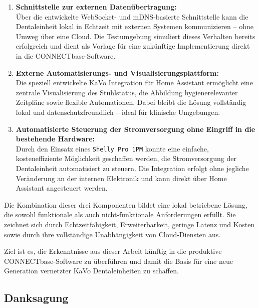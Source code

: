 \begin{enumerate}
    \item \textbf{Schnittstelle zur externen Datenübertragung:}\\  
    Über die entwickelte WebSocket- und mDNS-basierte Schnittstelle kann die Dentaleinheit lokal in Echtzeit mit externen Systemen kommunizieren – ohne Umweg über eine Cloud. Die Testumgebung simuliert dieses Verhalten bereits erfolgreich und dient als Vorlage für eine zukünftige Implementierung direkt in die CONNECTbase-Software.\\

    \item \textbf{Externe Automatisierungs- und Visualisierungsplattform:}\\  
    Die speziell entwickelte KaVo Integration für Home Assistant ermöglicht eine zentrale Visualisierung des Stuhlstatus, die Abbildung hygienerelevanter Zeitpläne sowie flexible Automationen. Dabei bleibt die Lösung vollständig lokal und datenschutzfreundlich – ideal für klinische Umgebungen.\\

    \item \textbf{Automatisierte Steuerung der Stromversorgung ohne Eingriff in die bestehende Hardware:}\\  
    Durch den Einsatz eines \texttt{Shelly Pro 1PM} konnte eine einfache, kosteneffiziente Möglichkeit geschaffen werden, die Stromversorgung der Dentaleinheit automatisiert zu steuern. Die Integration erfolgt ohne jegliche Veränderung an der internen Elektronik und kann direkt über Home Assistant angesteuert werden.\\
\end{enumerate}

Die Kombination dieser drei Komponenten bildet eine lokal betriebene Lösung, die sowohl funktionale als auch nicht-funktionale Anforderungen erfüllt. Sie zeichnet sich durch Echtzeitfähigkeit, Erweiterbarkeit, geringe Latenz und Kosten sowie durch ihre vollständige Unabhängigkeit von Cloud-Diensten aus.

Ziel ist es, die Erkenntnisse aus dieser Arbeit künftig in die produktive CONNECTbase-Software zu überführen und damit die Basis für eine neue Generation vernetzter KaVo Dentaleinheiten zu schaffen.

\subsection{Danksagung}

